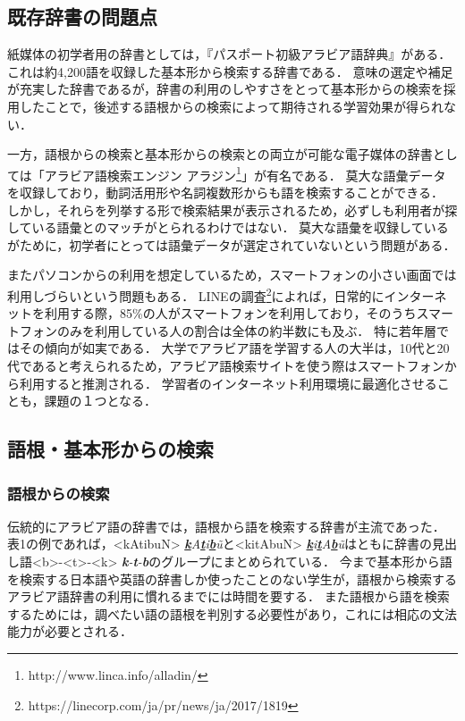 \documentclass[technicalreport]{ieicej}
\begin{document}
\subsection{既存辞書の問題点}
紙媒体の初学者用の辞書としては，『パスポート初級アラビア語辞典』\cite{honda1997}がある．
これは約4,200語を収録した基本形から検索する辞書である．
意味の選定や補足が充実した辞書であるが，辞書の利用のしやすさをとって基本形からの検索を採用したことで，後述する語根からの検索によって期待される学習効果が得られない．

一方，語根からの検索と基本形からの検索との両立が可能な電子媒体の辞書としては「アラビア語検索エンジン アラジン\footnote{http://www.linca.info/alladin/}」が有名である．
莫大な語彙データを収録しており，動詞活用形や名詞複数形からも語を検索することができる．
しかし，それらを列挙する形で検索結果が表示されるため，必ずしも利用者が探している語彙とのマッチがとられるわけではない．
莫大な語彙を収録しているがために，初学者にとっては語彙データが選定されていないという問題がある．

またパソコンからの利用を想定しているため，スマートフォンの小さい画面では利用しづらいという問題もある．
LINEの調査\footnote{https://linecorp.com/ja/pr/news/ja/2017/1819}によれば，日常的にインターネットを利用する際，85\%の人がスマートフォンを利用しており，そのうちスマートフォンのみを利用している人の割合は全体の約半数にも及ぶ．
特に若年層ではその傾向が如実である．
大学でアラビア語を学習する人の大半は，10代と20代であると考えられるため，アラビア語検索サイトを使う際はスマートフォンから利用すると推測される．
学習者のインターネット利用環境に最適化させることも，課題の１つとなる．

\subsection{語根・基本形からの検索}
\subsubsection{語根からの検索}
伝統的にアラビア語の辞書では，語根から語を検索する辞書が主流であった．
表1の例であれば，<kAtibuN> \textit{\underline{\textbf{k}}A\underline{\textbf{t}}i\underline{\textbf{b}}\~u}と<kitAbuN> \textit{\underline{\textbf{k}}i\underline{\textbf{t}}A\underline{\textbf{b}}\~u}はともに辞書の見出し語<b>-<t>-<k> \textit{\textbf{k}-\textbf{t}-\textbf{b}}のグループにまとめられている．
今まで基本形から語を検索する日本語や英語の辞書しか使ったことのない学生が，語根から検索するアラビア語辞書の利用に慣れるまでには時間を要する．
また語根から語を検索するためには，調べたい語の語根を判別する必要性があり，これには相応の文法能力が必要とされる．
\end{document}
